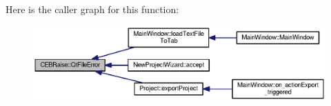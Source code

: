 Here is the caller graph for this function\-:\nopagebreak
\begin{figure}[H]
\begin{center}
\leavevmode
\includegraphics[width=350pt]{namespace_c_e_b_raise_a664ab19610a5a1b25b082ca8bdf51e7b_icgraph}
\end{center}
\end{figure}


